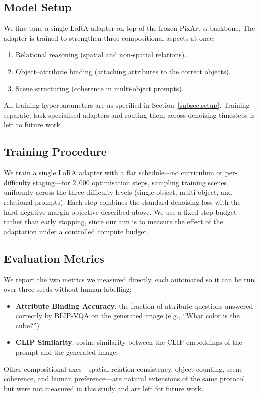 \documentclass[12pt,onecolumn]{IEEEtran}
\begin{document}
\subsection{Model Setup}
We fine-tune a single LoRA adapter on top of the frozen PixArt-$\alpha$ backbone. The adapter is trained to strengthen three compositional aspects at once:
\begin{enumerate}
    \item Relational reasoning (spatial and non-spatial relations).
    \item Object--attribute binding (attaching attributes to the correct objects).
    \item Scene structuring (coherence in multi-object prompts).
\end{enumerate}
All training hyperparameters are as specified in Section~\ref{subsec:setup}. Training separate, task-specialised adapters and routing them across denoising timesteps is left to future work.


\subsection{Training Procedure}
We train a single LoRA adapter with a flat schedule---no curriculum or
per-difficulty staging---for $2{,}000$ optimisation steps, sampling training
scenes uniformly across the three difficulty levels (single-object,
multi-object, and relational prompts). Each step combines the standard
denoising loss with the hard-negative margin objective described above. We use
a fixed step budget rather than early stopping, since our aim is to measure the
effect of the adaptation under a controlled compute budget.

\subsection{Evaluation Metrics}
We report the two metrics we measured directly, each automated so it can be run
over three seeds without human labelling:
\begin{itemize}
    \item \textbf{Attribute Binding Accuracy}: the fraction of attribute questions answered correctly by BLIP-VQA on the generated image (e.g., ``What color is the cube?'').
    \item \textbf{CLIP Similarity}: cosine similarity between the CLIP embeddings of the prompt and the generated image.
\end{itemize}
Other compositional axes---spatial-relation consistency, object counting, scene
coherence, and human preference---are natural extensions of the same protocol
but were not measured in this study and are left for future work.
\end{document}
